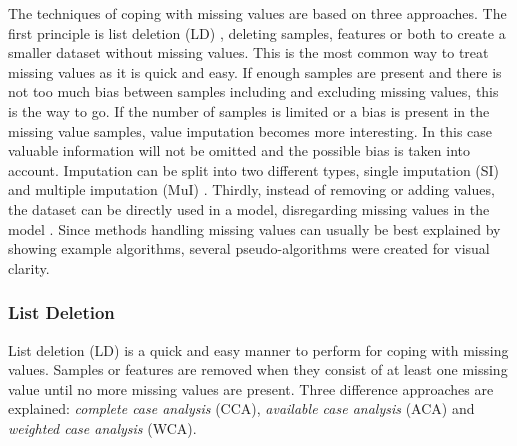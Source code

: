 \documentclass[10pt,a4paper]{report}
\begin{document}
	The techniques of coping with missing values are based on three approaches. The first principle is list deletion (LD) \cite{donders2006gentle, haukoos2007advanced}, deleting samples, features or both to create a smaller dataset without missing values. This is the most common way to treat missing values as it is quick and easy. If enough samples are present and there is not too much bias between samples including and excluding missing values, this is the way to go. If the number of samples is limited or a bias is present in the missing value samples, value imputation becomes more interesting. In this case valuable information will not be omitted and the possible bias is taken into account. Imputation can be split into two different types, single imputation (SI) \cite{donders2006gentle, cartwright2003dealing, haukoos2007advanced} and multiple imputation (MuI) \cite{donders2006gentle, patrician2002multiple, sterne2009multiple}. Thirdly, instead of removing or adding values, the dataset can be directly used in a model, disregarding missing values in the model \cite{myrtveit2001analyzing}. Since methods handling missing values can usually be best explained by showing example algorithms, several pseudo-algorithms were created for visual clarity.
	
	
	
	\subsubsection{List Deletion}
	\label{MVsubsec:ListDeletion}
	
	List deletion (LD) is a quick and easy manner to perform for coping with missing values. Samples or features are removed when they consist of at least one missing value until no more missing values are present. Three difference approaches are explained: \textit{complete case analysis} (CCA), \textit{available case analysis} (ACA) and \textit{weighted case analysis} (WCA).
	
\end{document}
